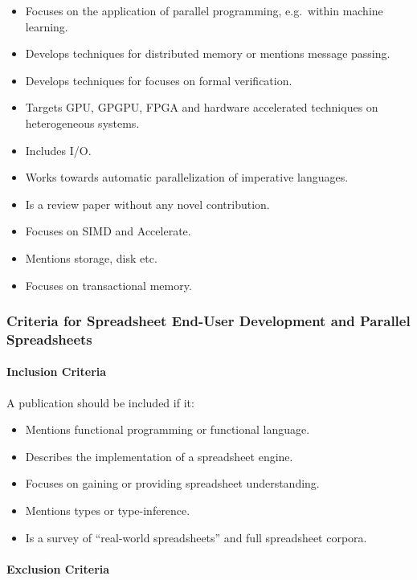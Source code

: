 \documentclass[a4paper]{article}
\begin{document}
\begin{itemize}
\item Focuses on the application of parallel programming, e.g.\ within
  machine learning.
\item Develops techniques for distributed memory or mentions message
  passing.
\item Develops techniques for focuses on formal verification.
\item Targets GPU, GPGPU, FPGA and hardware accelerated techniques on
  heterogeneous systems.
\item Includes I/O.
\item Works towards automatic parallelization of imperative languages.
\item Is a review paper without any novel contribution.
\item Focuses on SIMD and Accelerate. 
\item Mentions storage, disk etc.
\item Focuses on transactional memory.
\end{itemize}

\subsubsection{Criteria for Spreadsheet End-User Development and
  Parallel Spreadsheets}
\label{sec:crit-spre-end}

\paragraph{Inclusion Criteria}

A publication should be included if it:

\begin{itemize}
\item Mentions functional programming or functional language.
\item Describes the implementation of a spreadsheet engine.
\item Focuses on gaining or providing spreadsheet understanding.
\item Mentions types or type-inference.
\item Is a survey of ``real-world spreadsheets'' and full spreadsheet corpora.
\end{itemize}

\paragraph{Exclusion Criteria}
\end{document}
